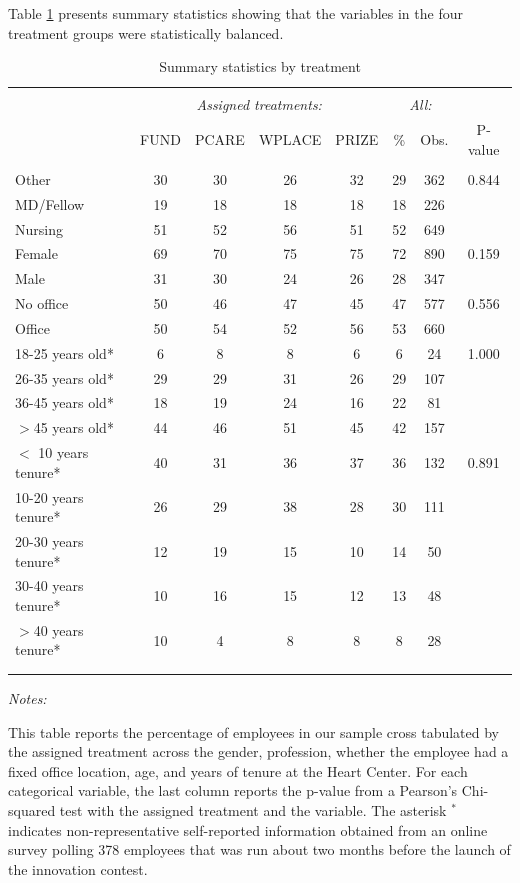 \documentclass[11pt, titlepage]{article}
\newenvironment{tablenotes}[1][]{
  \begin{minipage}{\textwidth}\emph{Notes:}{\footnotesize #1}
}{\end{minipage}}
\begin{document}
Table \ref{summary-statistics} presents summary statistics showing that
the variables in the four treatment groups were statistically balanced.

\begin{table}
\centering
\caption{Summary statistics by treatment}
\label{summary-statistics}
\begin{tabular}{@{}lccccccc}
  \\[-1.8ex]\hline \hline \\[-1.8ex]
 & \multicolumn{4}{c}{\emph{Assigned treatments:}} & \multicolumn{2}{c}{\emph{All:}} \\
\cmidrule(lr){2-5}\cmidrule(lr){6-7} & FUND & PCARE & WPLACE & PRIZE & \% & Obs. & P-value \\ 
  \hline \\[-1.86ex]
Other & 30 & 30 & 26 & 32 & 29 & 362 & 0.844 \\ 
  MD/Fellow & 19 & 18 & 18 & 18 & 18 & 226 &  \\ 
  Nursing & 51 & 52 & 56 & 51 & 52 & 649 &  \\ 
  [1.86ex] Female & 69 & 70 & 75 & 75 & 72 & 890 & 0.159 \\ 
  Male & 31 & 30 & 24 & 26 & 28 & 347 &  \\ 
  [1.86ex] No office & 50 & 46 & 47 & 45 & 47 & 577 & 0.556 \\ 
  Office & 50 & 54 & 52 & 56 & 53 & 660 &  \\ 
  [1.86ex] 18-25 years old* & 6 & 8 & 8 & 6 & 6 & 24 & 1.000 \\ 
  26-35 years old* & 29 & 29 & 31 & 26 & 29 & 107 &  \\ 
  36-45 years old* & 18 & 19 & 24 & 16 & 22 & 81 &  \\ 
  $>$45 years old* & 44 & 46 & 51 & 45 & 42 & 157 &  \\ 
  [1.86ex] $<$ 10 years tenure* & 40 & 31 & 36 & 37 & 36 & 132 & 0.891 \\ 
  10-20 years tenure* & 26 & 29 & 38 & 28 & 30 & 111 &  \\ 
  20-30 years tenure* & 12 & 19 & 15 & 10 & 14 & 50 &  \\ 
  30-40 years tenure* & 10 & 16 & 15 & 12 & 13 & 48 &  \\ 
  $>$40 years tenure* & 10 & 4 & 8 & 8 & 8 & 28 &  \\ 
   \\[-1.8ex]\hline \hline \\[-1.8ex]
\end{tabular}
\begin{tablenotes}
This table reports the percentage of employees in our sample cross tabulated by the assigned treatment across the gender, profession, whether the employee had a fixed office location, age, and years of tenure at the Heart Center. For each categorical variable, the last column reports the p-value from a Pearson's Chi-squared test with the assigned treatment and the variable. The asterisk $^{\ast}$ indicates non-representative self-reported information obtained from an online survey polling 378 employees that was run about two months before the launch of the innovation contest.
\end{tablenotes}
\end{table}
\end{document}
